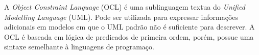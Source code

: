 A \textit{Object Constraint Language} (OCL) é uma sublinguagem textua do \textit{Unified Modelling Language} (UML).
Pode ser utilizada para expressar informações adicionais em modelos em que o UML padrão não é suficiente para
descrever. A OCL é baseada em lógica de predicados de primeira ordem, porém, possue uma sintaxe semelhante à
linguagens de programaço.
